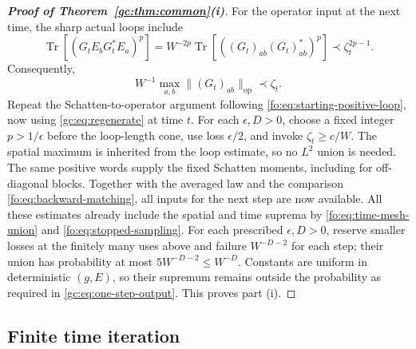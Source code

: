 \documentclass[11pt]{article}
\numberwithin{equation}{section}
\theoremstyle{remark}
\newcommand{\Tr}{\operatorname{Tr}}
\newcommand{\op}{\mathrm{op}}
\begin{document}
\begin{proof}[\textbf{Proof of Theorem~\ref{gc:thm:common}(i)}]
For the operator input at the next time, the sharp actual loops include
\begin{equation}\label{gc:eq:regenerate}
 \Tr[(G_t E_bG_t^*E_a)^p]
 =W^{-2p}\Tr[((G_t)_{ab}(G_t)_{ab}^*)^p]
 \prec\zeta_t^{2p-1}.
\end{equation}
Consequently,
\begin{equation}\label{fo:eq:operator-regeneration}
 W^{-1}\max_{a,b}\|(G_t)_{ab}\|_{\op}\prec\zeta_t.
\end{equation}
Repeat the Schatten-to-operator argument following
\eqref{fo:eq:starting-positive-loop}, now using
\eqref{gc:eq:regenerate} at time $t$.
For each $\epsilon,D>0$, choose a fixed integer $p>1/\epsilon$
before the loop-length cone, use loss $\epsilon/2$, and invoke
$\zeta_t\ge c/W$. The spatial maximum is inherited from the loop
estimate, so no $L^2$ union is needed. The same positive words supply
the fixed Schatten moments, including for off-diagonal blocks.
Together with the averaged law
and the comparison \eqref{fo:eq:backward-matching}, all inputs for
the next step are now available. All these estimates already include
the spatial and time suprema by \eqref{fo:eq:time-mesh-union} and
\eqref{fo:eq:stopped-sampling}. For each prescribed $\epsilon,D>0$,
reserve smaller losses at the finitely many uses above and failure
$W^{-D-2}$ for each step; their union has probability at most
$5W^{-D-2}\le W^{-D}$. Constants are uniform in deterministic $(g,E)$,
so their supremum remains outside the probability as required in
\eqref{gc:eq:one-step-output}. This proves part (i).
\end{proof}

\subsection{Finite time iteration}\label{sec:gc-schedule}
\end{document}
